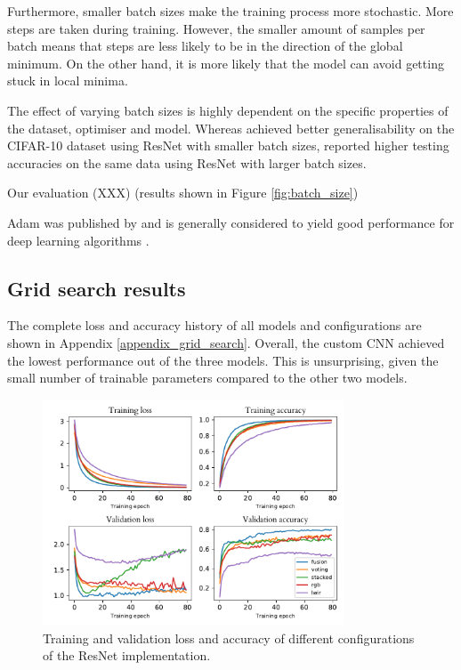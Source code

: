 \documentclass{l4proj}
\begin{document}
Furthermore, smaller batch sizes make the training process more stochastic. More steps are taken during training. However, the smaller amount of samples per batch means that steps are less likely to be in the direction of the global minimum. On the other hand, it is more likely that the model can avoid getting stuck in local minima.

The effect of varying batch sizes is highly dependent on the specific properties of the dataset, optimiser and model. Whereas \citet{masters_revisiting_2018} achieved better generalisability on the CIFAR-10 dataset \citep{krizhevsky_learning_2009} using ResNet with smaller batch sizes, \citet{radiuk_impact_2017} reported higher testing accuracies on the same data using ResNet with larger batch sizes.

Our evaluation (XXX) (results shown in Figure \ref{fig:batch_size}) 

Adam was published by \citet{kingma_adam_2014} and is generally considered to yield good performance for deep learning algorithms \citep{alom_history_2018}.

\subsection{Grid search results}

The complete loss and accuracy history of all models and configurations are shown in Appendix \ref{appendix_grid_search}. Overall, the custom CNN achieved the lowest performance out of the three models. This is unsurprising, given the small number of trainable parameters compared to the other two models.

\begin{figure}[ht]
  \centering
  \includegraphics[width=0.8\textwidth]{images/evaluation/gridsearch/ResNet}
  \caption{Training and validation loss and accuracy of different configurations of the ResNet implementation.}
  \label{fig:resnet_configs}
\end{figure}
\end{document}
